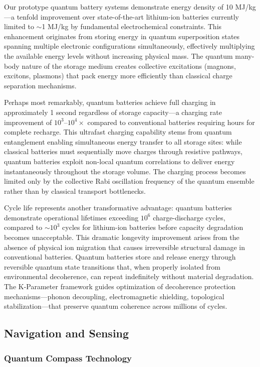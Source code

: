 \documentclass[11pt,a4paper,twoside]{article}
\begin{document}
Our prototype quantum battery systems demonstrate energy density of 10 MJ/kg---a tenfold improvement over state-of-the-art lithium-ion batteries currently limited to $\sim$1 MJ/kg by fundamental electrochemical constraints. This enhancement originates from storing energy in quantum superposition states spanning multiple electronic configurations simultaneously, effectively multiplying the available energy levels without increasing physical mass. The quantum many-body nature of the storage medium creates collective excitations (magnons, excitons, plasmons) that pack energy more efficiently than classical charge separation mechanisms.

Perhaps most remarkably, quantum batteries achieve full charging in approximately 1 second regardless of storage capacity---a charging rate improvement of $10^3$--$10^4\times$ compared to conventional batteries requiring hours for complete recharge. This ultrafast charging capability stems from quantum entanglement enabling simultaneous energy transfer to all storage sites: while classical batteries must sequentially move charges through resistive pathways, quantum batteries exploit non-local quantum correlations to deliver energy instantaneously throughout the storage volume. The charging process becomes limited only by the collective Rabi oscillation frequency of the quantum ensemble rather than by classical transport bottlenecks.

Cycle life represents another transformative advantage: quantum batteries demonstrate operational lifetimes exceeding $10^6$ charge-discharge cycles, compared to $\sim 10^3$ cycles for lithium-ion batteries before capacity degradation becomes unacceptable. This dramatic longevity improvement arises from the absence of physical ion migration that causes irreversible structural damage in conventional batteries. Quantum batteries store and release energy through reversible quantum state transitions that, when properly isolated from environmental decoherence, can repeat indefinitely without material degradation. The K-Parameter framework guides optimization of decoherence protection mechanisms---phonon decoupling, electromagnetic shielding, topological stabilization---that preserve quantum coherence across millions of cycles.

\subsection{Navigation and Sensing}

\subsubsection{Quantum Compass Technology}
\end{document}

